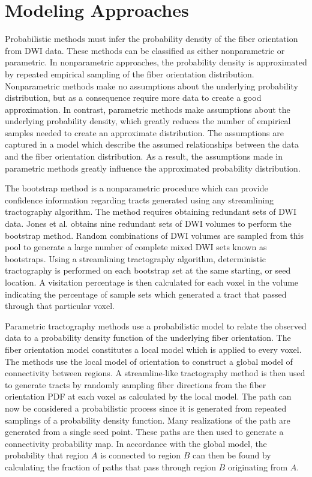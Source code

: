 \section{Modeling Approaches}
Probabilistic methods must infer the probability density of the fiber orientation from DWI data.  These methods can be classified as either nonparametric or parametric.  In nonparametric approaches, the probability density is approximated by repeated empirical sampling of the fiber orientation distribution.  Nonparametric methods make no assumptions about the underlying probability distribution, but as a consequence require more data to create a good approximation.  In contrast, parametric methods make assumptions about the underlying probability density, which greatly reduces the number of empirical samples needed to create an approximate distribution. The assumptions are captured in a model which describe the assumed relationships between the data and the fiber orientation distribution.  As a result, the assumptions made in parametric methods greatly influence the approximated probability distribution.

The bootstrap method is a nonparametric procedure which can provide confidence information regarding tracts generated using any streamlining tractography algorithm.  The method requires obtaining redundant sets of DWI data.  Jones et al. \cite{derek} obtains nine redundant sets of DWI volumes to perform the bootstrap method.  Random combinations of DWI volumes are sampled from this pool to generate a large number of complete mixed DWI sets known as bootstraps.  Using a streamlining tractography algorithm, deterministic tractography is performed on each bootstrap set at the same starting, or seed location.  A visitation percentage is then calculated for each voxel in the volume indicating the percentage of sample sets which generated a tract that passed through that particular voxel.

Parametric tractography methods use a probabilistic model to relate the observed data to a probability density function of the underlying fiber orientation.  The fiber orientation model constitutes a local model which is applied to every voxel.  The methods use the local model of orientation to construct a global model of connectivity between regions.  A streamline-like tractography method is then used to generate tracts by randomly sampling fiber directions from the fiber orientation PDF at each voxel as calculated by the local model.  The path can now be considered a probabilistic process since it is generated from repeated samplings of a probability density function.  Many realizations of the path are generated from a single seed point.  These paths are then used to generate a connectivity probability map.  In accordance with the global model, the probability that region $A$ is connected to region $B$ can then be found by calculating the fraction of paths that pass through region $B$ originating from $A$.


